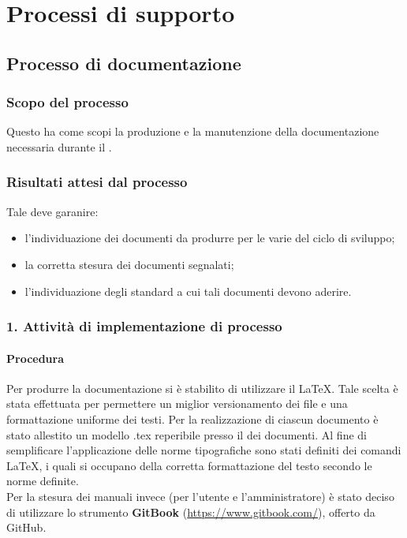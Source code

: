 \section{Processi di supporto}
\subsection{Processo di documentazione}


\subsubsection{Scopo del processo}
Questo  ha come scopi la produzione e la manutenzione della documentazione necessaria durante il .
\subsubsection{Risultati attesi dal processo}
Tale  deve garanire:
\begin{itemize}
\item l'individuazione dei documenti da produrre per le varie  del ciclo di sviluppo;
\item la corretta stesura dei documenti segnalati;
\item l'individuazione degli standard a cui tali documenti devono aderire.
\end{itemize}


\subsubsection{1. Attivit\`a di implementazione di processo}    %
  \paragraph*{Procedura}
  Per produrre la documentazione si è stabilito di utilizzare il  \LaTeX. Tale scelta è stata effettuata per permettere un miglior versionamento dei file e una formattazione uniforme dei testi.
  Per la realizzazione di ciascun documento \`e stato allestito un modello .tex reperibile presso il  dei documenti. Al fine di 
  semplificare l'applicazione delle norme tipografiche sono stati definiti dei comandi \LaTeX, i quali si occupano della corretta formattazione del testo
  secondo le norme definite.\\
  Per la stesura dei manuali invece (per l'utente e l'amministratore) è stato deciso di utilizzare lo strumento \textbf{GitBook} (\url{https://www.gitbook.com/}), offerto 
  da GitHub.
